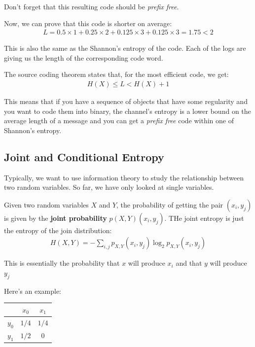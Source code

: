 \documentclass[11pt,a4paper,titlepage,dvipsnames,cmyk]{scrartcl}
\begin{document}
Don't forget that this resulting code should be \textit{prefix free}.

Now, we can prove that this code is shorter on average:
\begin{align*}
L = 0.5 \times 1 + 0.25 \times 2 + 0.125 \times 3 + 0.125 \times 3 = 1.75 < 2
\end{align*}

This is also the same as the Shannon's entropy of the code. Each of the logs are giving us the length of the corresponding code word.

The source coding theorem states that, for the most efficient code, we get:
\begin{align*}
H(X) \le L < H(X) + 1
\end{align*}

This means that if you have a sequence of objects that have some regularity and you want to code them into binary, the channel's entropy is a lower bound on the average length of a message and you can get a \textit{prefix free} code within one of Shannon's entropy.

\subsection{Joint and Conditional Entropy}
Typically, we want to use information theory to study the relationship between two random variables. So far, we have only looked at single variables.

\begin{tcolorbox} [space to upper,
collower=white,
title={Joint Entropy},
nobeforeafter,
halign lower=flush right, ]
Given two random variables $X$ and $Y$, the probability of getting the pair $(x_i, y_j)$ is given by the \textbf{joint probability} $p(X,Y) (x_i,y_j)$. THe joint entropy is just the entropy of the join distribution:
\begin{align*}
H(X,Y) = - \sum_{i,j}p_{X, Y}(x_i, y_j)\log_2p_{X,Y}(x_i,y_j)
\end{align*}

This is essentially the probability that $x$ will produce $x_i$ and that $y$ will produce $y_j$
\end{tcolorbox}

Here's an example:
\begin{center}
    \begin{tabular}{c|cc}
        & $x_0$ & $x_1$ \\ \midrule
        $y_0$ & $1/4$ & $1/4$ \\
        $y_1$ & $1/2$ & $0$
    \end{tabular}
\end{center}
\end{document}
